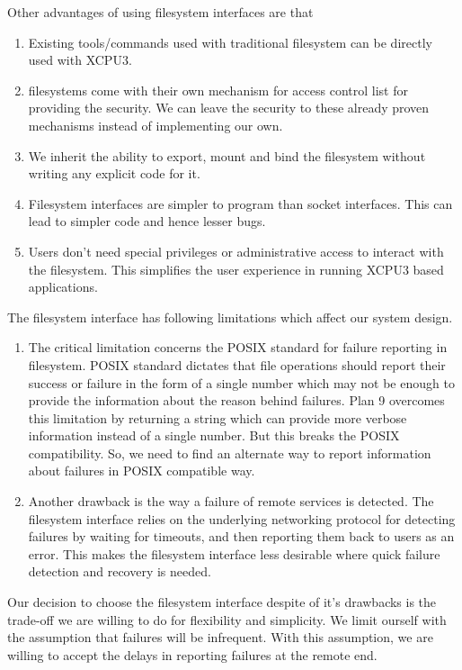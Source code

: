 Other advantages of using filesystem interfaces are that
\begin{enumerate}
\item Existing tools/commands used with traditional filesystem can be directly
used with XCPU3.

\item filesystems come with their own mechanism for access control list for
providing the security.  We can leave the security to these already proven
mechanisms instead of implementing our own.

\item We inherit the ability to export, mount and bind the filesystem
without writing any explicit code for it.

\item Filesystem interfaces are simpler to program than socket interfaces.  This
can lead to simpler code and hence lesser bugs.

\item Users don't need special privileges or administrative access to interact
with the filesystem.  This simplifies the user experience in running XCPU3 based
applications.
\end{enumerate}

The filesystem interface has following limitations which affect our system
design.
\begin{enumerate}

\item The critical limitation concerns the POSIX standard for failure
reporting in filesystem.  POSIX standard dictates that file operations should
report their success or failure in the form of a single number which may not be
enough to provide the information about the reason behind failures.  Plan 9
overcomes this limitation by returning a string which can provide more
verbose information instead of a single number.  But this breaks the POSIX
compatibility.  So, we need to find an alternate way to report information
about failures in POSIX compatible way.

\item Another drawback is the way a failure of remote services is detected.
The filesystem interface relies on the underlying networking protocol for
detecting failures by waiting for timeouts, and then reporting them back to
users as an error.  This makes the filesystem interface less desirable where
quick failure detection and recovery is needed.
\end{enumerate}

Our decision to choose the filesystem interface despite of it's drawbacks is the
trade-off we are willing to do for flexibility and simplicity.  We limit
ourself with the assumption that failures will be infrequent.  With this
assumption, we are willing to accept the delays in reporting failures at the
remote end.

